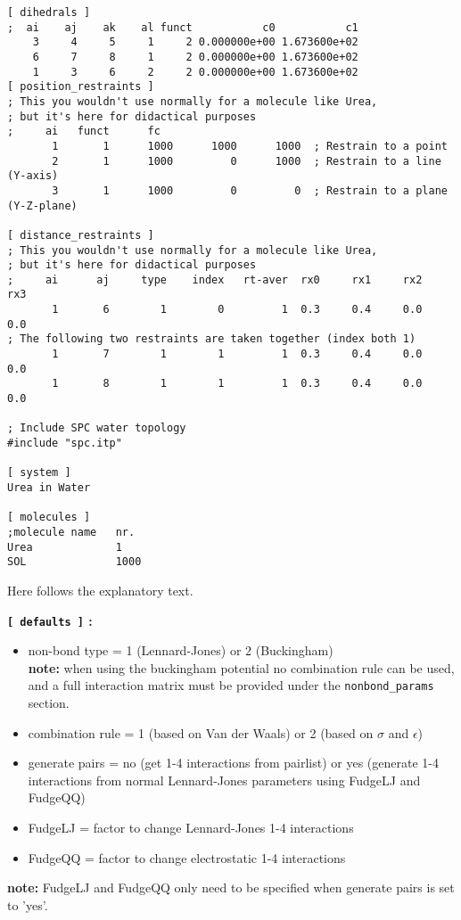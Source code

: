 {\begin{verbatim}
[ dihedrals ]
;  ai    aj    ak    al funct           c0           c1
    3     4     5     1     2 0.000000e+00 1.673600e+02 
    6     7     8     1     2 0.000000e+00 1.673600e+02 
    1     3     6     2     2 0.000000e+00 1.673600e+02  
[ position_restraints ]
; This you wouldn't use normally for a molecule like Urea,
; but it's here for didactical purposes
;     ai   funct      fc
       1       1      1000      1000      1000  ; Restrain to a point
       2       1      1000         0      1000  ; Restrain to a line (Y-axis)
       3       1      1000         0         0  ; Restrain to a plane (Y-Z-plane)
   
[ distance_restraints ]
; This you wouldn't use normally for a molecule like Urea,
; but it's here for didactical purposes
;     ai      aj     type    index   rt-aver  rx0     rx1     rx2     rx3
       1       6        1        0         1  0.3     0.4     0.0     0.0 
; The following two restraints are taken together (index both 1)
       1       7        1        1         1  0.3     0.4     0.0     0.0 
       1       8        1        1         1  0.3     0.4     0.0     0.0 

; Include SPC water topology
#include "spc.itp"

[ system ]
Urea in Water

[ molecules ]
;molecule name   nr.
Urea             1
SOL              1000
\end{verbatim}}
Here follows the explanatory text.

{\bf \verb'[ defaults ]' :}
\begin{itemize}
\item non-bond type = 1 (Lennard-Jones) or 2 (Buckingham)\\
{\bf note:} when using the buckingham potential no combination rule can
be used, and a full interaction matrix must be provided under the 
{\tt nonbond\_params} section.
\item combination rule = 1 (based on Van der Waals) or 2 (based on
$\sigma$ and $\epsilon$)
\item generate pairs = no (get 1-4 interactions from pairlist) or yes
(generate 1-4 interactions from normal Lennard-Jones parameters using
FudgeLJ and FudgeQQ)
\item FudgeLJ = factor to change Lennard-Jones 1-4 interactions
\item FudgeQQ = factor to change electrostatic 1-4 interactions
\end{itemize}
{\bf note:} FudgeLJ and FudgeQQ only need to be specified when
generate pairs is set to 'yes'.

